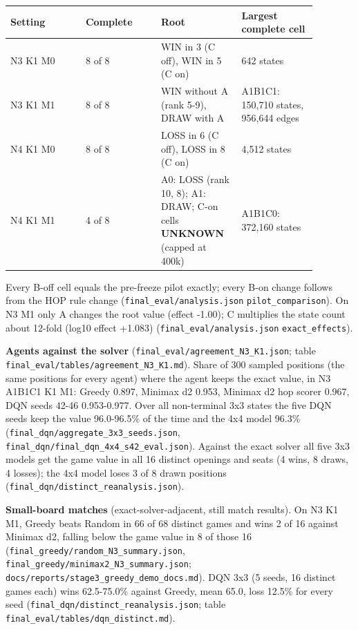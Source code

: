 \documentclass[11pt]{article}
\begin{document}
\begin{center}\scriptsize
\begin{longtable}{p{0.22\linewidth}p{0.22\linewidth}p{0.22\linewidth}p{0.22\linewidth}}
\toprule
Setting & Complete & Root & Largest complete cell \\
\midrule
N3 K1 M0 & 8 of 8 & WIN in 3 (C off), WIN in 5 (C on) & 642 states \\
N3 K1 M1 & 8 of 8 & WIN without A (rank 5-9), DRAW with A & A1B1C1: 150,710 states, 956,644 edges \\
N4 K1 M0 & 8 of 8 & LOSS in 6 (C off), LOSS in 8 (C on) & 4,512 states \\
N4 K1 M1 & 4 of 8 & A0: LOSS (rank 10, 8); A1: DRAW; C-on cells \textbf{UNKNOWN} (capped at 400k) & A1B1C0: 372,160 states \\
\bottomrule
\end{longtable}
\end{center}

Every B-off cell equals the pre-freeze pilot exactly; every B-on change follows from the HOP
rule change (\texttt{final\_eval/analysis.json} \texttt{pilot\_comparison}). On N3 M1 only A changes the root
value (effect -1.00); C multiplies the state count about 12-fold (log10 effect +1.083)
(\texttt{final\_eval/analysis.json} \texttt{exact\_effects}).

\textbf{Agents against the solver} (\texttt{final\_eval/agreement\_N3\_K1.json}; table \texttt{final\_eval/tables/agreement\_N3\_K1.md}).
Share of 300 sampled positions (the same positions for every agent) where the agent keeps the
exact value, in N3 A1B1C1 K1 M1: Greedy 0.897, Minimax d2 0.953, Minimax d2 hop scorer 0.967,
DQN seeds 42-46 0.953-0.977. Over all non-terminal 3x3 states the five DQN seeds keep the value
96.0-96.5\% of the time and the 4x4 model 96.3\% (\texttt{final\_dqn/aggregate\_3x3\_seeds.json},
\texttt{final\_dqn/final\_dqn\_4x4\_s42\_eval.json}). Against the exact solver all five 3x3 models get the
game value in all 16 distinct openings and seats (4 wins, 8 draws, 4 losses); the 4x4 model loses
3 of 8 drawn positions (\texttt{final\_dqn/distinct\_reanalysis.json}).

\textbf{Small-board matches} (exact-solver-adjacent, still match results). On N3 K1 M1, Greedy beats
Random in 66 of 68 distinct games and wins 2 of 16 against Minimax d2, falling below the game
value in 8 of those 16 (\texttt{final\_greedy/random\_N3\_summary.json}, \texttt{final\_greedy/minimax2\_N3\_summary.json};
\texttt{docs/reports/stage3\_greedy\_demo\_docs.md}). DQN 3x3 (5 seeds, 16 distinct games each) wins
62.5-75.0\% against Greedy, mean 65.0, loss 12.5\% for every seed (\texttt{final\_dqn/distinct\_reanalysis.json};
table \texttt{final\_eval/tables/dqn\_distinct.md}).
\end{document}
